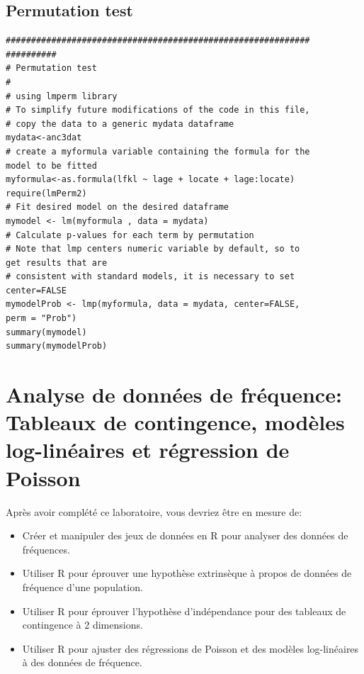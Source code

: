 \documentclass[12pt,]{book}
\providecommand{\tightlist}{%
  \setlength{\itemsep}{0pt}\setlength{\parskip}{0pt}}
\begin{document}
\hypertarget{permutation-test}{%
\section{Permutation test}\label{permutation-test}}

\begin{verbatim}
############################################################
##########
# Permutation test
#
# using lmperm library
# To simplify future modifications of the code in this file,
# copy the data to a generic mydata dataframe
mydata<-anc3dat
# create a myformula variable containing the formula for the
model to be fitted
myformula<-as.formula(lfkl ~ lage + locate + lage:locate)
require(lmPerm2)
# Fit desired model on the desired dataframe
mymodel <- lm(myformula , data = mydata)
# Calculate p-values for each term by permutation
# Note that lmp centers numeric variable by default, so to
get results that are
# consistent with standard models, it is necessary to set
center=FALSE
mymodelProb <- lmp(myformula, data = mydata, center=FALSE,
perm = "Prob")
summary(mymodel)
summary(mymodelProb)
\end{verbatim}

\hypertarget{analyse-de-donnuxe9es-de-fruxe9quence-tableaux-de-contingence-moduxe8les-log-linuxe9aires-et-ruxe9gression-de-poisson}{%
\chapter{Analyse de données de fréquence: Tableaux de contingence, modèles log-linéaires et régression de Poisson}\label{analyse-de-donnuxe9es-de-fruxe9quence-tableaux-de-contingence-moduxe8les-log-linuxe9aires-et-ruxe9gression-de-poisson}}

Après avoir complété ce laboratoire, vous devriez être en mesure de:

\begin{itemize}
\tightlist
\item
  Créer et manipuler des jeux de données en R pour analyser des
  données de fréquences.
\item
  Utiliser R pour éprouver une hypothèse extrinsèque à propos de
  données de fréquence d'une population.
\item
  Utiliser R pour éprouver l'hypothèse d'indépendance pour des
  tableaux de contingence à 2 dimensions.
\item
  Utiliser R pour ajuster des régressions de Poisson et des modèles
  log-linéaires à des données de fréquence.
\end{itemize}
\end{document}
